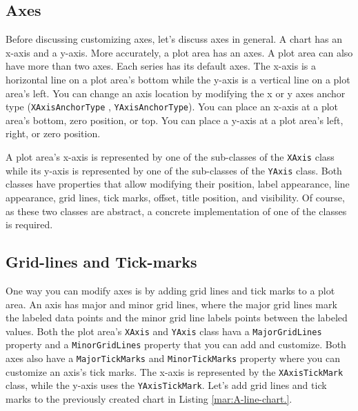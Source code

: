 \documentclass[american,letterpaper]{tufte-book}
\numberwithin{equation}{section}
\numberwithin{figure}{section}
\begin{document}
{\subsection{Axes}

Before discussing customizing axes, let’s discuss axes in general.
A chart has an x-axis and a y-axis. More accurately, a plot area has
an axes. A plot area can also have more than two axes. Each series
has its default axes. The x-axis is a horizontal line on a plot area's
bottom while the y-axis is a vertical line on a plot area's left.
You can change an axis location by modifying the x or y axes anchor
type (\texttt{XAxisAnchorType} , \texttt{YAxisAnchorType}). You can
place an x-axis at a plot area's bottom, zero position, or top. You
can place a y-axis at a plot area's left, right, or zero position. 

A plot area's x-axis is represented by one of the sub-classes of the
\texttt{XAxis} class while its y-axis is represented by one of the
sub-classes of the \texttt{YAxis} class. Both classes have properties
that allow modifying their position, label appearance, line appearance,
grid lines, tick marks, offset, title position, and visibility. Of
course, as these two classes are abstract, a concrete implementation
of one of the classes is required.

\subsection{Grid-lines and Tick-marks}

One way you can modify axes is by adding grid lines and tick marks
to a plot area. An axis has major and minor grid lines, where the
major grid lines mark the labeled data points and the minor grid line
labels points between the labeled values. Both the plot area's \texttt{XAxis}
and \texttt{YAxis} class hava a \texttt{MajorGridLines} property and
a \texttt{MinorGridLines} property that you can add and customize.
Both axes also have a \texttt{MajorTickMarks} and \texttt{MinorTickMarks}
property where you can customize an axis's tick marks. The x-axis
is represented by the \texttt{XAxisTickMark} class, while the y-axis
uses the \texttt{YAxisTickMark}. Let's add grid lines and tick marks
to the previously created chart in Listing \ref{mar:A-line-chart.}.

}
\end{document}

